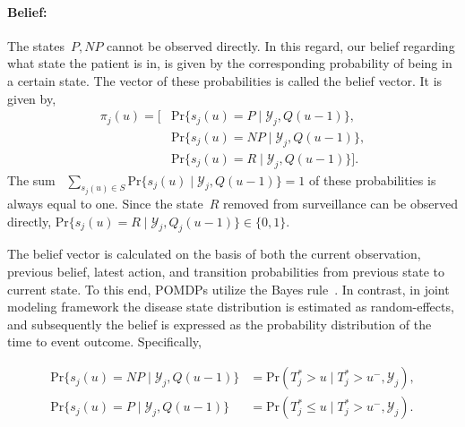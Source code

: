 \begin{subappendices}
\paragraph{\textbf{Belief}:} The states~$P, NP$ cannot be observed directly. In this regard, our belief regarding what state the patient is in, is given by the corresponding probability of being in a certain state. The vector of these probabilities is called the belief vector. It is given by,
\begin{equation*}
\begin{split}
\pi_j(u) = \Big[& \mbox{Pr}\big\{s_j(u)=P \mid \mathcal{Y}_j, Q(u-1)\big\}, \\
& \mbox{Pr}\big\{s_j(u)=NP \mid \mathcal{Y}_j, Q(u-1)\big\},\\
&\mbox{Pr}\big\{s_j(u)=R \mid \mathcal{Y}_j, Q(u-1)\big\}\Big].
\end{split}
\end{equation*} 
The sum ~$\sum_{s_j(u) \in S} \mbox{Pr}\{s_j(u) \mid \mathcal{Y}_j, Q(u-1)\} = 1$ of these probabilities is always equal to one. Since the state~$R$ removed from surveillance can be observed directly, $\mbox{Pr}\{s_j(u)=R \mid \mathcal{Y}_j, Q_j(u-1)\} \in \{0,1\}$.

The belief vector is calculated on the basis of both the current observation, previous belief, latest action, and transition probabilities from previous state to current state. To this end, POMDPs utilize the Bayes rule~\citep{steimle2017markov}. In contrast, in joint modeling framework the disease state distribution is estimated as random-effects, and subsequently the belief is expressed as the probability distribution of the time to event outcome. Specifically, 

\begin{equation}
\label{c4:eq:belief_jm}
\begin{split}
\mbox{Pr}\big\{s_j(u)=NP \mid \mathcal{Y}_j, Q(u-1)\big\} &= \mbox{Pr}(T^*_j > u \mid T^*_j>u^-, \mathcal{Y}_j),\\
\mbox{Pr}\big\{s_j(u)=P \mid \mathcal{Y}_j, Q(u-1)\big\} &= \mbox{Pr}(T^*_j \leq u \mid T^*_j>u^-, \mathcal{Y}_j).
\end{split}
\end{equation} 


\end{subappendices}
